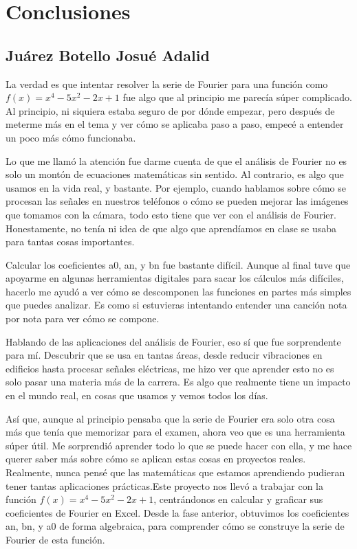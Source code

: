 \section{Conclusiones}
\subsection{Juárez Botello Josué Adalid}

La verdad es que intentar resolver la serie de Fourier para una función como \(f(x)=x^4-5x^2-2x+1\) fue algo que al principio me parecía súper complicado. Al principio, ni siquiera estaba seguro de por dónde empezar, pero después de meterme más en el tema y ver cómo se aplicaba paso a paso, empecé a entender un poco más cómo funcionaba.

Lo que me llamó la atención fue darme cuenta de que el análisis de Fourier no es solo un montón de ecuaciones matemáticas sin sentido. Al contrario, es algo que usamos en la vida real, y bastante. Por ejemplo, cuando hablamos sobre cómo se procesan las señales en nuestros teléfonos o cómo se pueden mejorar las imágenes que tomamos con la cámara, todo esto tiene que ver con el análisis de Fourier. Honestamente, no tenía ni idea de que algo que aprendíamos en clase se usaba para tantas cosas importantes.

Calcular los coeficientes a0, an, y bn fue bastante difícil. Aunque al final tuve que apoyarme en algunas herramientas digitales para sacar los cálculos más difíciles, hacerlo me ayudó a ver cómo se descomponen las funciones en partes más simples que puedes analizar. Es como si estuvieras intentando entender una canción nota por nota para ver cómo se compone.

Hablando de las aplicaciones del análisis de Fourier, eso sí que fue sorprendente para mí. Descubrir que se usa en tantas áreas, desde reducir vibraciones en edificios hasta procesar señales eléctricas, me hizo ver que aprender esto no es solo pasar una materia más de la carrera. Es algo que realmente tiene un impacto en el mundo real, en cosas que usamos y vemos todos los días.

Así que, aunque al principio pensaba que la serie de Fourier era solo otra cosa más que tenía que memorizar para el examen, ahora veo que es una herramienta súper útil. Me sorprendió aprender todo lo que se puede hacer con ella, y me hace querer saber más sobre cómo se aplican estas cosas en proyectos reales. Realmente, nunca pensé que las matemáticas que estamos aprendiendo pudieran tener tantas aplicaciones prácticas.Este proyecto nos llevó a trabajar con la función \(f(x)=x^4-5x^2-2x+1\), centrándonos en calcular y graficar sus coeficientes de Fourier en Excel. Desde la fase anterior, obtuvimos los coeficientes an\hspace{0pt}, bn, y a0 de forma algebraica, para comprender cómo se construye la serie de Fourier de esta función.

